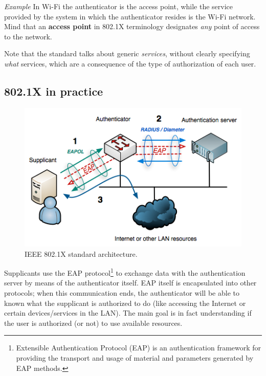 \vspace{0.5em}

\emph{Example} In Wi-Fi the authenticator is the access point, while the service provided by the system in which the authenticator resides is the Wi-Fi network. Mind that an \textbf{access point} in 802.1X terminology designates \textit{any} point of access to the network.

\vspace{0.5em}

Note that the standard talks about generic \textit{services}, without clearly specifying \textit{what} services, which are a consequence of the type of authorization of each user.


\subsection{802.1X in practice}
\begin{figure}[h]
    \centering
    \includegraphics[scale=1]{img/auth_1x.png}
    \decoRule
    \caption{IEEE 802.1X standard architecture.}
    \label{fig:auth_1x}
\end{figure}

Supplicants use the EAP protocol\footnote{Extensible Authentication Protocol (EAP) is an authentication framework for providing the transport and usage of material and parameters generated by EAP methods.} to exchange data with the authentication server by means of the authenticator itself. EAP itself is encapsulated into other protocols; when this communication ends, the authenticator will be able to known what the supplicant is authorized to do (like accessing the Internet or certain devices/services in the LAN). The main goal is in fact understanding if the user is authorized (or not) to use available resources.
 
